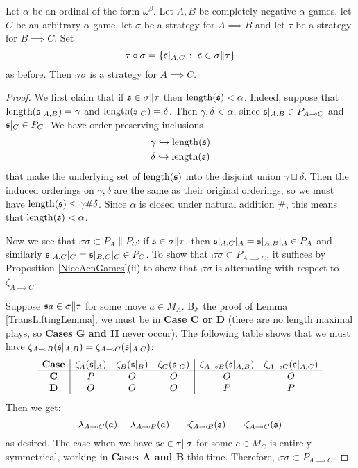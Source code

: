 \documentclass[11pt]{article} %
\begin{document}
\begin{corollary}
  Let $\alpha$ be an ordinal of the form $\omega^{\beta}$.  Let $A,B$ be completely negative $\alpha$-games, let $C$ be an arbitrary $\alpha$-game, let $\sigma$ be a strategy for $A\implies B$ and let $\tau$ be a strategy for $B\implies C$.  Set
  \[
    \tau \circ \sigma = \{\mathfrak s\vert_{A,C}\;\colon\;\mathfrak s\in\sigma\|\tau\}
    \]
  as before.  Then $\comp\tau\sigma$ is a strategy for $A\implies C$.

  \begin{proof}
    We first claim that if $\mathfrak s\in\sigma\|\tau$ then $\operatorname{length}(\mathfrak s)<\alpha$.  Indeed, suppose that $\operatorname{length}(\mathfrak s\vert_{A,B})=\gamma$ and $\operatorname{length}(\mathfrak s\vert_C)=\delta$.  Then $\gamma,\delta<\alpha$, since $\mathfrak s\vert_{A,B}\in P_{A\multimap C}$ and $\mathfrak s\vert_C\in P_C$.  We have order-preserving inclusions
    \begin{gather*}
      \gamma\hookrightarrow\operatorname{length}(\mathfrak s)\\
      \delta\hookrightarrow\operatorname{length}(\mathfrak s)
    \end{gather*}
    that make the underlying set of $\operatorname{length}(\mathfrak s)$ into the disjoint union $\gamma\sqcup\delta$.  Then the induced orderings on $\gamma,\delta$ are the same as their original orderings, so we must have $\operatorname{length}(\mathfrak s)\le\gamma\#\delta$.  Since $\alpha$ is closed under natural addition $\#$, this means that $\operatorname{length}(\mathfrak s)<\alpha$.  

    Now we see that $\comp\tau\sigma\subset P_A\|P_C$: if $\mathfrak s\in\sigma\|\tau$, then $\mathfrak s\vert_{A,C}\vert_A=\mathfrak s\vert_{A,B}\vert_A\in P_A$ and similarly $\mathfrak s\vert_{A,C}\vert_C=\mathfrak s\vert_{B,C}\vert_C\in P_C$.  To show that $\comp\tau\sigma\subset P_{A\implies C}$, it suffices by Proposition \ref{NiceAcnGames}(ii) to show that $\comp\tau\sigma$ is alternating with respect to $\zeta_{A\implies C}$.

    Suppose $\mathfrak s a\in\sigma\|\tau$ for some move $a\in M_A$.  By the proof of Lemma \ref{TransLiftingLemma}, we must be in \textbf{Case C or D} (there are no length maximal plays, so \textbf{Cases G and H} never occur).  The following table shows that we must have $\zeta_{A\multimap B}(\mathfrak s\vert_{A,B})=\zeta_{A\multimap C}(\mathfrak s\vert_{A,C})$:
    \[
      \begin{array}{c|ccc|cc}
        \textbf{Case} & \zeta_A(\mathfrak s\vert_A) & \zeta_B(\mathfrak s\vert_B) & \zeta_C(\mathfrak s\vert_C) & \zeta_{A\multimap B}(\mathfrak s\vert_{A,B}) & \zeta_{A\multimap C}(\mathfrak s\vert_{A,C}) \\
        \hline
        \textbf{C} & P & O & O & O & O \\
        \textbf{D} & O & O & O & P & P \\
      \end{array}
      \]
    Then we get:
    \[
      \lambda_{A\multimap C}(a) = \lambda_{A\multimap B}(a) = \neg\zeta_{A\multimap B}(\mathfrak s) = \neg\zeta_{A\multimap C}(\mathfrak s)
      \]
    as desired.  The case when we have $\mathfrak s c\in\tau\|\sigma$ for some $c\in M_C$ is entirely symmetrical, working in \textbf{Cases A and B} this time.  Therefore, $\comp\tau\sigma\subset P_{A\implies C}$.  


\end{proof}
\end{corollary}
\end{document}
